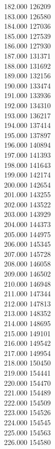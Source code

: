 { 182.000	126209 \\
 183.000	126580 \\
 184.000	127036 \\
 185.000	127539 \\
 186.000	127930 \\
 187.000	131371 \\
 188.000	131692 \\
 189.000	132156 \\
 190.000	133474 \\
 191.000	133936 \\
 192.000	134310 \\
 193.000	136217 \\
 194.000	137414 \\
 195.000	137897 \\
 196.000	140894 \\
 197.000	141393 \\
 198.000	141643 \\
 199.000	142174 \\
 200.000	142654 \\
 201.000	143255 \\
 202.000	143522 \\
 203.000	143929 \\
 204.000	144373 \\
 205.000	144975 \\
 206.000	145345 \\
 207.000	145728 \\
 208.000	146058 \\
 209.000	146502 \\
 210.000	146948 \\
 211.000	147344 \\
 212.000	147813 \\
 213.000	148352 \\
 214.000	148695 \\
 215.000	149101 \\
 216.000	149542 \\
 217.000	149954 \\
 218.000	150450 \\
 219.000	154441 \\
 220.000	154470 \\
 221.000	154489 \\
 222.000	154509 \\
 223.000	154526 \\
 224.000	154545 \\
 225.000	154563 \\
 226.000	154580 \\
}
